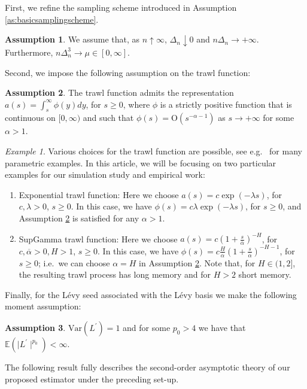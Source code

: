 \documentclass{article}
\theoremstyle{plain}
\theoremstyle{definition}
\newtheorem{assumption}{Assumption}
\theoremstyle{remark}
\newtheorem{example}{Example}
\newcommand{\Var}{\ensuremath{\mathrm{Var}}}
\newcommand{\Levy}{L\'{e}vy }
\begin{document}
First, we refine the sampling scheme introduced in Assumption \ref{as:basicsamplingscheme}.
\begin{assumption}\label{as:samplingscheme} We assume that, as $n\uparrow\infty$,
	$\Delta_{n}\downarrow0$ and $n\Delta_{n}\rightarrow+\infty.$ Furthermore,
	$n\Delta_{n}^{3}\rightarrow\mu\in[0,\infty]$. \end{assumption}
Second, we  impose the following assumption on the trawl
function: 
\begin{assumption}\label{as:trawl} The trawl function admits the
	representation 
	$
	a(s)=\int_{s}^{\infty}\phi(y)dy$, for $s\geq0$, 
	where $\phi$ is a strictly positive function that is continuous on $[0,\infty)$ and such
	that $\phi(s)=\mathrm{O}(s^{-\alpha-1})$ as $s\rightarrow+\infty$
	for some $\alpha>1$.
	
\end{assumption}
\begin{example}\label{ex:partrawl}
	Various choices for the trawl function are possible, see e.g.~\cite{BNLSV2014} for many parametric examples. In this article, we will be focusing on two particular examples for our simulation study and empirical work:
	\begin{enumerate}
		\item Exponential trawl function: Here we choose $a(s)=c\exp(-\lambda s)$, for $c, \lambda >0$, $s\geq 0$. In this case, we have $\phi(s)=c \lambda \exp(-\lambda s)$, for $s\geq 0$, and Assumption \ref{as:trawl} is satisfied for any $\alpha>1$.
		\item SupGamma trawl function: Here we choose $a(s)=c\left(1+\frac{s}{\overline{\alpha}}\right)^{-H}$, for $c, \overline{\alpha} >0, H>1$, $s\geq 0$. In this case, we have $\phi(s)=c\frac{H}{\overline{\alpha}}\left(1+\frac{s}{\overline{\alpha}}\right)^{-H-1}$, for $s\geq 0$; i.e.~we can choose $\alpha=H$ in Assumption \ref{as:trawl}. Note that, for $H \in (1, 2]$, the resulting trawl process has long memory and for $H>2$ short memory. 
	\end{enumerate}
\end{example}
Finally, for the \Levy seed associated with the \Levy basis we make the following
moment assumption:
\begin{assumption}\label{as:seed} $	\Var(L^{\prime})=1$
	and for some $p_{0}>4$ we have that $\mathbb{E}(\mid L^{\prime}\mid^{p_{0}})<\infty$. \end{assumption} 
The following result fully describes the second-order asymptotic theory of our proposed
estimator under the preceding set-up. 
\end{document}
